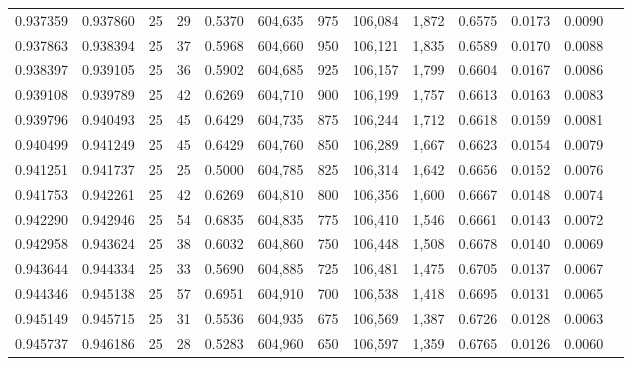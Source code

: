 \begin{tabular}{rrrrrrrrrrrrr}
0.937359 & 0.937860 &    25 &  29 &                                     0.5370 & 604,635 &     975 & 106,084 &   1,872 & 0.6575 & 0.0173 & 0.0090 \\
0.937863 & 0.938394 &    25 &  37 &                                     0.5968 & 604,660 &     950 & 106,121 &   1,835 & 0.6589 & 0.0170 & 0.0088 \\
0.938397 & 0.939105 &    25 &  36 &                                     0.5902 & 604,685 &     925 & 106,157 &   1,799 & 0.6604 & 0.0167 & 0.0086 \\
0.939108 & 0.939789 &    25 &  42 &                                     0.6269 & 604,710 &     900 & 106,199 &   1,757 & 0.6613 & 0.0163 & 0.0083 \\
0.939796 & 0.940493 &    25 &  45 &                                     0.6429 & 604,735 &     875 & 106,244 &   1,712 & 0.6618 & 0.0159 & 0.0081 \\
0.940499 & 0.941249 &    25 &  45 &                                     0.6429 & 604,760 &     850 & 106,289 &   1,667 & 0.6623 & 0.0154 & 0.0079 \\
0.941251 & 0.941737 &    25 &  25 &                                     0.5000 & 604,785 &     825 & 106,314 &   1,642 & 0.6656 & 0.0152 & 0.0076 \\
0.941753 & 0.942261 &    25 &  42 &                                     0.6269 & 604,810 &     800 & 106,356 &   1,600 & 0.6667 & 0.0148 & 0.0074 \\
0.942290 & 0.942946 &    25 &  54 &                                     0.6835 & 604,835 &     775 & 106,410 &   1,546 & 0.6661 & 0.0143 & 0.0072 \\
0.942958 & 0.943624 &    25 &  38 &                                     0.6032 & 604,860 &     750 & 106,448 &   1,508 & 0.6678 & 0.0140 & 0.0069 \\
0.943644 & 0.944334 &    25 &  33 &                                     0.5690 & 604,885 &     725 & 106,481 &   1,475 & 0.6705 & 0.0137 & 0.0067 \\
0.944346 & 0.945138 &    25 &  57 &                                     0.6951 & 604,910 &     700 & 106,538 &   1,418 & 0.6695 & 0.0131 & 0.0065 \\
0.945149 & 0.945715 &    25 &  31 &                                     0.5536 & 604,935 &     675 & 106,569 &   1,387 & 0.6726 & 0.0128 & 0.0063 \\
0.945737 & 0.946186 &    25 &  28 &                                     0.5283 & 604,960 &     650 & 106,597 &   1,359 & 0.6765 & 0.0126 & 0.0060 \\

\end{tabular}

